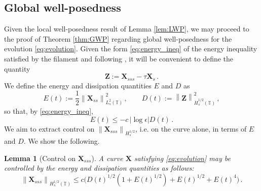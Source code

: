 \documentclass[11pt,reqno]{amsart}
\newcommand{\T}{\mathbb{T}}
\newcommand{\X}{\bm{X}}
\newcommand{\abs}[1]{\left\lvert #1 \right\rvert}
\newcommand{\norm}[1]{\left\lVert #1 \right\rVert}
\numberwithin{equation}{section}
\newtheorem{lemma}[theorem]{Lemma}
\theoremstyle{definition}
\begin{document}
\subsection{Global well-posedness}\label{subsec:GWP}
Given the local well-posedness result of Lemma \ref{lem:LWP}, we may proceed to the proof of Theorem \eqref{thm:GWP} regarding global well-posedness for the evolution \eqref{eq:evolution}.
%
Given the form \eqref{eq:energy_ineq} of the energy inequality satisfied by the filament and following \cite{koiso1996motion,oelz2011curve,albritton2025rods}, it will be convenient to define the quantity 
\begin{equation}\label{eq:zee}
  \bm{Z} := \X_{sss}-\tau\X_s\,.
\end{equation}
We define the energy and dissipation quantities $E$ and $D$ as 
\begin{equation}\label{eq:EandD}
  E(t) := \frac{1}{2}\norm{\X_{ss}}_{L^2_s(\T)}^2\,, \qquad
  D(t) := \norm{\bm{Z}}_{\dot H^{1/2}_s(\T)}^2\,,
\end{equation}
so that, by \eqref{eq:energy_ineq},
\begin{equation}\label{eq:EandD_ineq}
  E(t) \le -c\,\abs{\log\epsilon} D(t)\,.
\end{equation}
%
%
We aim to extract control on $\norm{\X_{sss}}_{H^{1/2}_s}$, i.e. on the curve alone, in terms of $E$ and $D$. We show the following.
\begin{lemma}[Control on $\X_{sss}$]\label{lem:Xsss_control}
  A curve $\X$ satisfying \eqref{eq:evolution} may be controlled by the energy and dissipation quantities as follows:
  \begin{equation}\label{eq:Xsss_control}
    \norm{\X_{sss}}_{H^{1/2}_s(\T)} \le c\big( D(t)^{1/2}(1+E(t)^{1/2}) + E(t)^{1/2}+ E(t)^4\big)\,.
\end{equation} 
\end{lemma}
\end{document}
